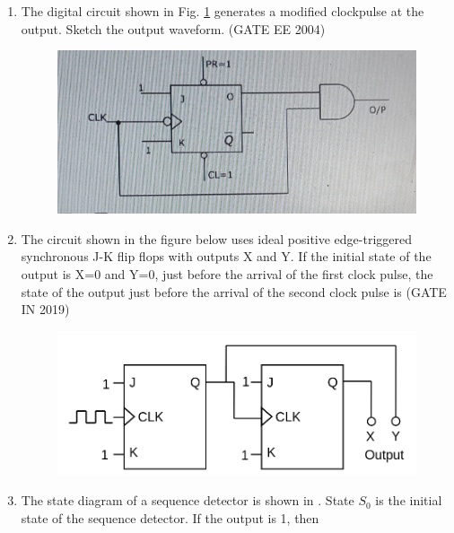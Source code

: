 \begin{enumerate}
	\item The digital circuit shown in Fig. \ref{fig:2004-gate-ee-68} generates a modified clockpulse at the output. Sketch the output waveform.
\label{prob:2004-gate-ee-68}
\hfill (GATE EE 2004)


\begin{figure}[h]
	\centering
	\includegraphics[width=\columnwidth]{figs/2004-gate-ee-68.jpg}
	\caption{}
\label{fig:2004-gate-ee-68}
\end{figure}
\item The circuit shown in the figure below uses ideal positive edge-triggered synchronous J-K flip flops with outputs X and Y. If the initial state of the output is X=0 and Y=0, just before the arrival of the first clock pulse, the state of the output just before the arrival of the second clock pulse is
\label{prob:2019-gate-in-12}
\hfill (GATE IN 2019)
\begin{figure}[!h]
	\begin{center} 
	    \includegraphics[width=\columnwidth]{figs/2019-gate-in-12.png}
	\end{center}
\caption{}
\label{fig:2019-gate-in-12}
\end{figure}
\item 	The state diagram of a sequence detector is shown in
		. State $S_0$ is the initial state of the sequence detector. If the output is 1, then

\end{enumerate}

